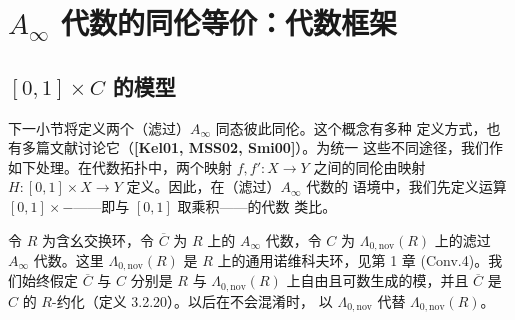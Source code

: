 
\section{$A_\infty$ 代数的同伦等价：代数框架}
\label{sec:4-2}

\subsection{$[0,1]\times C$ 的模型}
\label{subsec:4-2-1}

下一小节将定义两个（滤过）$A_\infty$ 同态彼此同伦。这个概念有多种
定义方式，也有多篇文献讨论它（\textbf{[Kel01, MSS02, Smi00]}）。为统一
这些不同途径，我们作如下处理。在代数拓扑中，两个映射
$f,f'\colon X\to Y$ 之间的同伦由映射
$H\colon[0,1]\times X\to Y$ 定义。因此，在（滤过）$A_\infty$ 代数的
语境中，我们先定义运算 $[0,1]\times-$——即与 $[0,1]$ 取乘积——的代数
类比。

令 $R$ 为含幺交换环，令 $\overline C$ 为 $R$ 上的 $A_\infty$ 代数，令
$C$ 为 $\Lambda_{0,\mathrm{nov}}(R)$ 上的滤过 $A_\infty$ 代数。这里
$\Lambda_{0,\mathrm{nov}}(R)$ 是 $R$ 上的通用诺维科夫环，见第 1 章
(Conv.4)。我们始终假定 $\overline C$ 与 $C$ 分别是 $R$ 与
$\Lambda_{0,\mathrm{nov}}(R)$ 上自由且可数生成的模，并且
$\overline C$ 是 $C$ 的 $R$-约化（定义 3.2.20）。以后在不会混淆时，
以 $\Lambda_{0,\mathrm{nov}}$ 代替 $\Lambda_{0,\mathrm{nov}}(R)$。


